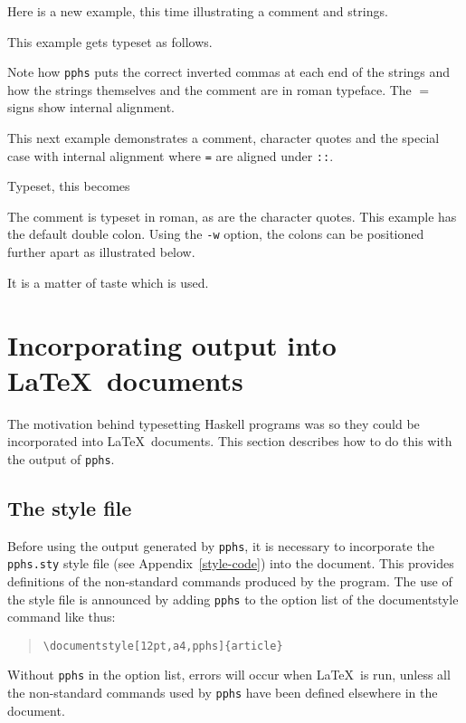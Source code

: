 Here is a new example, this time illustrating a comment and strings.
\begin{quote}

\end{quote}
This example gets typeset as follows.
\begin{quote}

\end{quote}
Note how {\tt pphs} puts the correct inverted commas at each end of the strings
and how the strings themselves and the comment are in roman typeface.
The $=$ signs show internal alignment.

This next example demonstrates a comment, character quotes and the special case
with internal alignment where {\tt =} are aligned under {\tt ::}.
\begin{quote}

\end{quote}
Typeset, this becomes
\begin{quote}

\end{quote}
The comment is typeset in roman, as are the character quotes.  This example has
the default double colon.  Using the {\tt -w} option, the colons can be positioned
further apart as illustrated below.
\begin{quote}

\end{quote}
It is a matter of taste which is used.

\section{Incorporating output into \LaTeX\ documents}

The motivation behind typesetting Haskell programs was so they could be incorporated
into \LaTeX\ documents.  This section describes how to do this with the output
of {\tt pphs}.

\subsection{The style file} \label{style-file}

Before using the output generated by {\tt pphs}, it is necessary to incorporate the
{\tt pphs.sty} style file (see Appendix~\ref{style-code}) into the document.
This provides definitions of the non-standard
commands produced by the program.  The use of the style file is announced
by adding {\tt pphs} to the option list of the documentstyle
command like thus:
\begin{quote}
\begin{verbatim}
\documentstyle[12pt,a4,pphs]{article}
\end{verbatim}
\end{quote}
Without {\tt pphs} in the option list, errors will occur when \LaTeX\ is run,
unless all the non-standard commands used by {\tt pphs} have been defined elsewhere
in the document.

